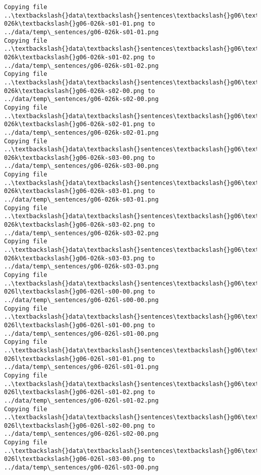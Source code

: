\documentclass[11pt]{article}
\begin{document}
\begin{Verbatim}[commandchars=\\\{\}]
Copying file ..\textbackslash{}data\textbackslash{}sentences\textbackslash{}g06\textbackslash{}g06-026k\textbackslash{}g06-026k-s01-01.png to
../data/temp\_sentences/g06-026k-s01-01.png
Copying file ..\textbackslash{}data\textbackslash{}sentences\textbackslash{}g06\textbackslash{}g06-026k\textbackslash{}g06-026k-s01-02.png to
../data/temp\_sentences/g06-026k-s01-02.png
Copying file ..\textbackslash{}data\textbackslash{}sentences\textbackslash{}g06\textbackslash{}g06-026k\textbackslash{}g06-026k-s02-00.png to
../data/temp\_sentences/g06-026k-s02-00.png
Copying file ..\textbackslash{}data\textbackslash{}sentences\textbackslash{}g06\textbackslash{}g06-026k\textbackslash{}g06-026k-s02-01.png to
../data/temp\_sentences/g06-026k-s02-01.png
Copying file ..\textbackslash{}data\textbackslash{}sentences\textbackslash{}g06\textbackslash{}g06-026k\textbackslash{}g06-026k-s03-00.png to
../data/temp\_sentences/g06-026k-s03-00.png
Copying file ..\textbackslash{}data\textbackslash{}sentences\textbackslash{}g06\textbackslash{}g06-026k\textbackslash{}g06-026k-s03-01.png to
../data/temp\_sentences/g06-026k-s03-01.png
Copying file ..\textbackslash{}data\textbackslash{}sentences\textbackslash{}g06\textbackslash{}g06-026k\textbackslash{}g06-026k-s03-02.png to
../data/temp\_sentences/g06-026k-s03-02.png
Copying file ..\textbackslash{}data\textbackslash{}sentences\textbackslash{}g06\textbackslash{}g06-026k\textbackslash{}g06-026k-s03-03.png to
../data/temp\_sentences/g06-026k-s03-03.png
Copying file ..\textbackslash{}data\textbackslash{}sentences\textbackslash{}g06\textbackslash{}g06-026l\textbackslash{}g06-026l-s00-00.png to
../data/temp\_sentences/g06-026l-s00-00.png
Copying file ..\textbackslash{}data\textbackslash{}sentences\textbackslash{}g06\textbackslash{}g06-026l\textbackslash{}g06-026l-s01-00.png to
../data/temp\_sentences/g06-026l-s01-00.png
Copying file ..\textbackslash{}data\textbackslash{}sentences\textbackslash{}g06\textbackslash{}g06-026l\textbackslash{}g06-026l-s01-01.png to
../data/temp\_sentences/g06-026l-s01-01.png
Copying file ..\textbackslash{}data\textbackslash{}sentences\textbackslash{}g06\textbackslash{}g06-026l\textbackslash{}g06-026l-s01-02.png to
../data/temp\_sentences/g06-026l-s01-02.png
Copying file ..\textbackslash{}data\textbackslash{}sentences\textbackslash{}g06\textbackslash{}g06-026l\textbackslash{}g06-026l-s02-00.png to
../data/temp\_sentences/g06-026l-s02-00.png
Copying file ..\textbackslash{}data\textbackslash{}sentences\textbackslash{}g06\textbackslash{}g06-026l\textbackslash{}g06-026l-s03-00.png to
../data/temp\_sentences/g06-026l-s03-00.png

\end{Verbatim}
\end{document}

